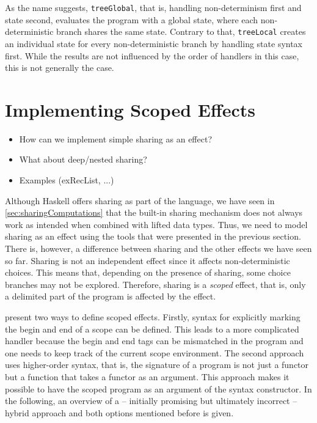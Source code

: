 \documentclass[a4paper, 11pt, fleqn, twoside]{scrreprt}
\newcommand{\hinl}[1]{\texttt{#1}}
\begin{document}
\vspace{0.32cm}

As the name suggests, \hinl{treeGlobal}, that is, handling non-determinism first and state second, evaluates the program with a global state, where each non-deterministic branch shares the same state.
Contrary to that, \hinl{treeLocal} creates an individual state for every non-deterministic branch by handling state syntax first.
While the results are not influenced by the order of handlers in this case, this is not generally the case.

\section{Implementing Scoped Effects}
\label{sec:sharing}
\begin{itemize}
\item How can we implement simple sharing as an effect?
\item What about deep/nested sharing?
\item Examples (exRecList, ...)
\end{itemize}

Although Haskell offers sharing as part of the language, we have seen in \autoref{sec:sharingComputations} that the built-in sharing mechanism does not always work as intended when combined with lifted data types.
Thus, we need to model sharing as an effect using the tools that were presented in the previous section.
There is, however, a difference between sharing and the other effects we have seen so far.
Sharing is not an independent effect since it affects non-deterministic choices.
This means that, depending on the presence of sharing, some choice branches may not be explored.
Therefore, sharing is a \textit{scoped} effect, that is, only a delimited part of the program is affected by the effect.

\citet{wu2014effect} present two ways to define scoped effects.
Firstly, syntax for explicitly marking the begin and end of a scope can be defined.
This leads to a more complicated handler because the begin and end tags can be mismatched in the program and one needs to keep track of the current scope environment.
The second approach uses higher-order syntax, that is, the signature of a program is not just a functor but a function that takes a functor as an argument.
This approach makes it possible to have the scoped program as an argument of the syntax constructor.
In the following, an overview of a  -- initially promising but ultimately incorrect  -- hybrid approach and both options mentioned before is given.
\end{document}
